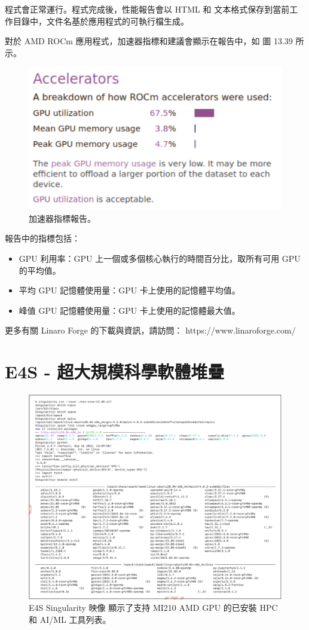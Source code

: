 程式會正常運行。程式完成後，性能報告會以 HTML 和 文本格式保存到當前工作目錄中，文件名基於應用程式的可執行檔生成。

對於 AMD ROCm 應用程式，加速器指標和建議會顯示在報告中，如 圖 13.39 所示。

\begin{figure}
    \centering
    \includegraphics[width=0.9\linewidth]{FileAusiliari/Screenshots/Figure13-39.png}
    \caption{加速器指標報告。}
    \label{fig:PAPI39}
\end{figure}

報告中的指標包括：
\begin{itemize}
    \item GPU 利用率：GPU 上一個或多個核心執行的時間百分比，取所有可用 GPU 的平均值。
    \item 平均 GPU 記憶體使用量：GPU 卡上使用的記憶體平均值。
    \item 峰值 GPU 記憶體使用量：GPU 卡上使用的記憶體最大值。
\end{itemize}

更多有關 Linaro Forge 的下載與資訊，請訪問：
https://www.linaroforge.com/


\section{E4S - 超大規模科學軟體堆疊}

\begin{figure}
    \centering
    \includegraphics[width=0.9\linewidth]{FileAusiliari/Screenshots/Figure13-40.png}
    \caption{E4S Singularity 映像 顯示了支持 MI210 AMD GPU 的已安裝 HPC 和 AI/ML 工具列表。}
    \label{fig:PAPI40}
\end{figure}

